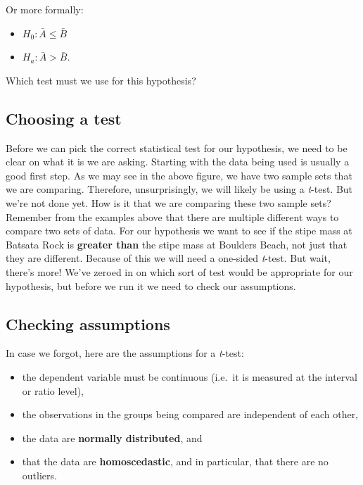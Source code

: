 \documentclass[english,10pt,a4paper,oneside]{book}
\providecommand{\tightlist}{%
  \setlength{\itemsep}{0pt}\setlength{\parskip}{0pt}}
\theoremstyle{definition}
\theoremstyle{definition}
\theoremstyle{definition}
\theoremstyle{remark}
\begin{document}
Or more formally:

\begin{itemize}
\tightlist
\item
  \(H_{0}: \bar{A} \leq \bar{B}\)
\item
  \(H_{a}: \bar{A} > \bar{B}\).
\end{itemize}

Which test must we use for this hypothesis?

\hypertarget{choosing-a-test}{%
\subsection{Choosing a test}\label{choosing-a-test}}

Before we can pick the correct statistical test for our hypothesis, we
need to be clear on what it is we are asking. Starting with the data
being used is usually a good first step. As we may see in the above
figure, we have two sample sets that we are comparing. Therefore,
unsurprisingly, we will likely be using a \emph{t}-test. But we're not
done yet. How is it that we are comparing these two sample sets?
Remember from the examples above that there are multiple different ways
to compare two sets of data. For our hypothesis we want to see if the
stipe mass at Batsata Rock is \textbf{greater than} the stipe mass at
Boulders Beach, not just that they are different. Because of this we
will need a one-sided \emph{t}-test. But wait, there's more! We've
zeroed in on which sort of test would be appropriate for our hypothesis,
but before we run it we need to check our assumptions.

\hypertarget{checking-assumptions}{%
\subsection{Checking assumptions}\label{checking-assumptions}}

In case we forgot, here are the assumptions for a \emph{t}-test:

\begin{itemize}
\tightlist
\item
  the dependent variable must be continuous (i.e.~it is measured at the
  interval or ratio level),
\item
  the observations in the groups being compared are independent of each
  other,
\item
  the data are \textbf{normally distributed}, and
\item
  that the data are \textbf{homoscedastic}, and in particular, that
  there are no outliers.
\end{itemize}
\end{document}
